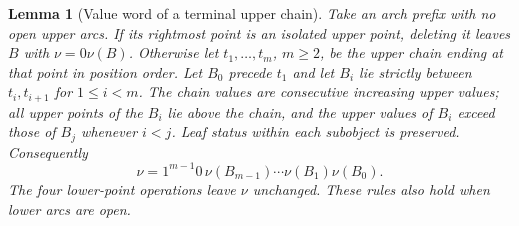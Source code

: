 \documentclass[11pt]{amsart}
\numberwithin{equation}{section}
\newtheorem{lemma}[theorem]{Lemma}
\theoremstyle{remark}\newtheorem{remark}[theorem]{Remark}
\begin{document}
\begin{lemma}[Value word of a terminal upper chain]\label{lem:word}
Take an arch prefix with no open upper arcs. If its rightmost point is an isolated upper point, deleting it leaves $B$ with $\nu=0\nu(B)$. Otherwise let $t_1,\ldots,t_m$, $m\geq2$, be the upper chain ending at that point in position order. Let $B_0$ precede $t_1$ and let $B_i$ lie strictly between $t_i,t_{i+1}$ for $1\leq i<m$. The chain values are consecutive increasing upper values; all upper points of the $B_i$ lie above the chain, and the upper values of $B_i$ exceed those of $B_j$ whenever $i<j$. Leaf status within each subobject is preserved. Consequently
\begin{equation}\label{eq:word}
 \nu=1^{m-1}0\,\nu(B_{m-1})\cdots\nu(B_1)\nu(B_0).
\end{equation}
The four lower-point operations leave $\nu$ unchanged. These rules also hold when lower arcs are open.
\end{lemma}
\end{document}
